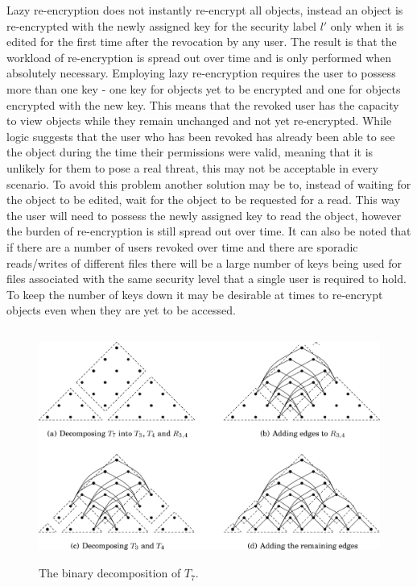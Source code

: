 \documentclass[12pt, titlepage]{article}
\begin{document}
\newline \indent Lazy re-encryption does not instantly re-encrypt all objects, instead an object is re-encrypted with the newly assigned key for the security label $l'$ only when it is edited for the first time after the revocation by any user. The result is that the workload of re-encryption is spread out over time and is only performed when absolutely necessary. Employing lazy re-encryption requires the user to possess more than one key - one key for objects yet to be encrypted and one for objects encrypted with the new key.\cite{lazyEncryption} This means that the revoked user has the capacity to view objects while they remain unchanged and not yet re-encrypted. While logic suggests that the user who has been revoked has already been able to see the object during the time their permissions were valid, meaning that it is unlikely for them to pose a real threat, this may not be acceptable in every scenario. To avoid this problem another solution may be to, instead of waiting for the object to be edited, wait for the object to be requested for a read. This way the user will need to possess the newly assigned key to read the object, however the burden of re-encryption is still spread out over time. It can also be noted that if there are a number of users revoked over time and there are sporadic reads/writes of different files there will be a large number of keys being used for files associated with the same security level that a single user is required to hold. To keep the number of keys down it may be desirable at times to re-encrypt objects even when they are yet to be accessed.

\begin{figure}
\centerline{\includegraphics[height=3.0in,width=6in,angle=0]{binarydecompo.pdf}}
\caption{The binary decomposition of $T_{7}$.\cite{mainPaper}}
\label{fig:binarydecomp}
\end{figure}
\end{document}
